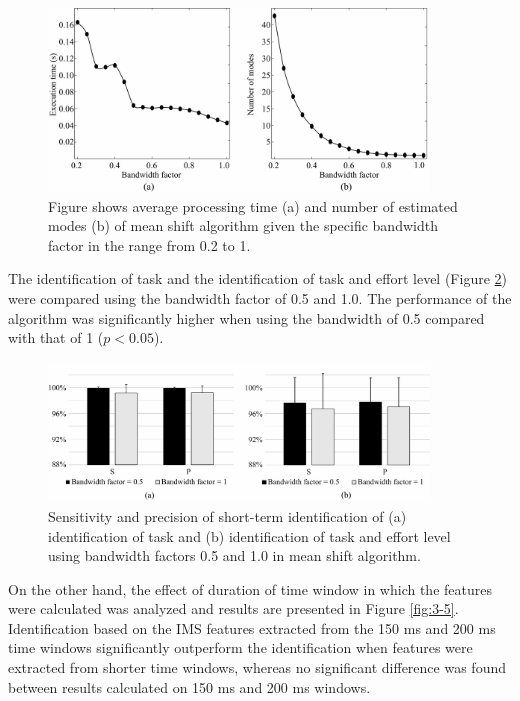 \begin{figure}[ht]
\centering
\includegraphics[width=0.9\textwidth]{Images/figure3_3.png}
\caption{Figure shows average processing time (a) and number of estimated modes (b) of mean shift algorithm given the specific bandwidth factor in the range from 0.2 to 1.}
\label{fig:3-3}
\end{figure}   

The identification of task and the identification of task and effort level (Figure \ref{fig:3-4}) were compared using the bandwidth factor of 0.5 and 1.0. The performance of the algorithm was significantly higher when using the bandwidth of 0.5 compared with that of 1 ($p < 0.05$).

\begin{figure}[ht]
\centering
\includegraphics[width=0.9\textwidth]{Images/figure3_4.png}
\caption{Sensitivity and precision of short-term identification of (a) identification of task and (b) identification of task and effort level using bandwidth factors 0.5 and 1.0 in mean shift algorithm.}
\label{fig:3-4}
\end{figure}   

On the other hand, the effect of duration of time window in which the features were calculated was analyzed and results are presented in Figure \ref{fig:3-5}. Identification based on the IMS features extracted from the 150 ms and 200 ms time windows significantly outperform the identification when features were extracted from shorter time windows, whereas no significant difference was found between results calculated on 150 ms and 200 ms windows.

